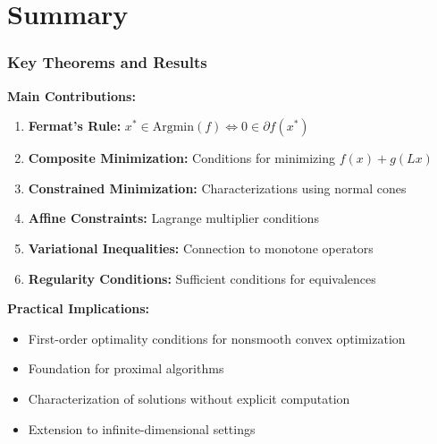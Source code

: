 \documentclass[aspectratio=169,10pt]{beamer}
\begin{document}
\section{Summary}

\begin{frame}[allowframebreaks]
\frametitle{Key Theorems and Results}

\textbf{Main Contributions:}

\begin{enumerate}
    \item \textbf{Fermat's Rule:} $x^* \in \text{Argmin}(f) \iff 0 \in \partial f(x^*)$

    \item \textbf{Composite Minimization:} Conditions for minimizing $f(x) + g(Lx)$

    \item \textbf{Constrained Minimization:} Characterizations using normal cones

    \item \textbf{Affine Constraints:} Lagrange multiplier conditions

    \item \textbf{Variational Inequalities:} Connection to monotone operators

    \item \textbf{Regularity Conditions:} Sufficient conditions for equivalences
\end{enumerate}

\vspace{0.3cm}

\textbf{Practical Implications:}
\begin{itemize}
    \item First-order optimality conditions for nonsmooth convex optimization
    \item Foundation for proximal algorithms
    \item Characterization of solutions without explicit computation
    \item Extension to infinite-dimensional settings
\end{itemize}

\end{frame}
\end{document}
